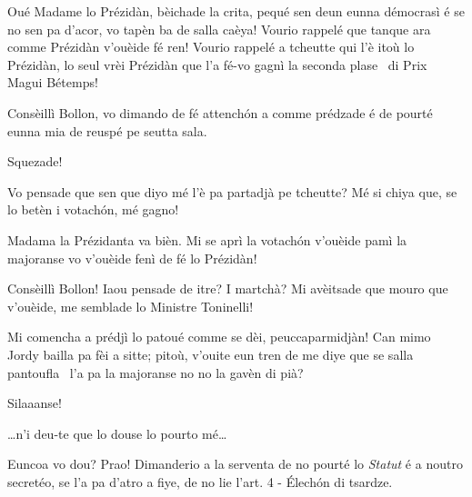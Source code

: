 \begin{drama}
\Jordyspeaks Oué Madame lo Prézidàn, bèichade la crita, pequé sen deun eunna démocrasì é se no sen pa d'acor, vo tapèn ba de salla caèya! Vourio rappelé que tanque ara comme Prézidàn v'ouèide fé ren! Vourio rappelé a tcheutte qui l'è itoù lo Prézidàn, lo seul vrèi Prézidàn que l'a fé-vo gagnì la seconda plase \second\ di Prix Magui Bétemps!


\Presidanspeaks Consèillì Bollon, vo dimando de fé attench\'on a comme prédzade é de pourté eunna mia de reuspé pe seutta sala.

\Jordyspeaks Squezade!

\Presidanspeaks{} Vo pensade que sen que diyo mé l'è pa partadjà pe tcheutte? Mé si chiya que, se lo betèn i votach\'on, mé gagno!


\Jordyspeaks  Madama la Prézidanta va bièn. Mi se aprì la votach\'on v'ouèide pamì la majoranse vo v'ouèide fenì de fé lo Prézidàn!

\Dallasspeaks  Consèillì Bollon! Iaou pensade de itre? I martchà? Mi avèitsade que mouro que v'ouèide, me semblade lo Ministre Toninelli!

\Cimaspeaks {} Mi comencha a prédjì lo patoué comme se dèi, peuccaparmidjàn! Can mimo Jordy bailla pa fèi a sitte; pitoù, v'ouite eun tren de me diye que se salla pantoufla \pantoufla\ l'a pa la majoranse no no la gavèn di pià?


\Presidanspeaks{}  Silaaanse!


\Richardspeaks \ldots  n'i deu-te que lo douse lo pourto mé\ldots

\Presidanspeaks Euncoa vo dou? Prao! Dimanderio a la serventa de no pourté lo \textit{Statut} é a noutro secretéo, se l'a pa d'atro a fiye, de no lie l'art. 4 - \'Elech\'on di tsardze.



\end{drama}
